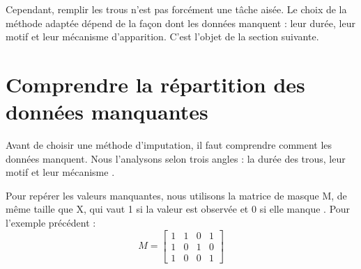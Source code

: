 
Cependant, remplir les trous n’est pas forcément une tâche aisée.
Le choix de la méthode adaptée dépend de la façon dont les données manquent : leur durée, leur motif et leur mécanisme d'apparition.
C’est l’objet de la section suivante.

\section{Comprendre la répartition des données manquantes}

Avant de choisir une méthode d’imputation, il faut comprendre comment les données manquent. 
Nous l’analysons selon trois angles : la durée des trous, leur motif et leur mécanisme \cite{Zahmatkesh_2026}.

Pour repérer les valeurs manquantes, nous utilisons la matrice de masque \gls{M}, de même taille que \gls{X}, qui vaut 1 si la valeur est observée et 0 si elle manque \cite{Fang_2020}. Pour l'exemple précédent :
\begin{equation}
M = \begin{bmatrix}
1 & 1 & 0 & 1 \\
1 & 0 & 1 & 0 \\
1 & 0 & 0 & 1
\end{bmatrix}
\end{equation}

